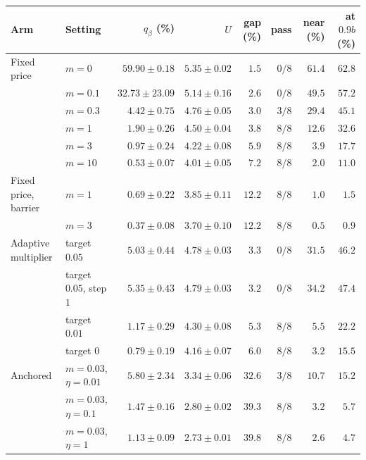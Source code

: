 \setlength{\tabcolsep}{4pt}\begin{tabular}{llrrrrrr}
\toprule
Arm & Setting & $q_\beta$ (\%) & $U$ & gap (\%) & pass & near (\%) & at $0.9b$ (\%) \\
\midrule
Fixed price & $m=0$ & $59.90\pm0.18$ & $5.35\pm0.02$ & $1.5$ & $0/8$ & $61.4$ & $62.8$ \\
 & $m=0.1$ & $32.73\pm23.09$ & $5.14\pm0.16$ & $2.6$ & $0/8$ & $49.5$ & $57.2$ \\
 & $m=0.3$ & $4.42\pm0.75$ & $4.76\pm0.05$ & $3.0$ & $3/8$ & $29.4$ & $45.1$ \\
 & $m=1$ & $1.90\pm0.26$ & $4.50\pm0.04$ & $3.8$ & $8/8$ & $12.6$ & $32.6$ \\
 & $m=3$ & $0.97\pm0.24$ & $4.22\pm0.08$ & $5.9$ & $8/8$ & $3.9$ & $17.7$ \\
 & $m=10$ & $0.53\pm0.07$ & $4.01\pm0.05$ & $7.2$ & $8/8$ & $2.0$ & $11.0$ \\
Fixed price, barrier & $m=1$ & $0.69\pm0.22$ & $3.85\pm0.11$ & $12.2$ & $8/8$ & $1.0$ & $1.5$ \\
 & $m=3$ & $0.37\pm0.08$ & $3.70\pm0.10$ & $12.2$ & $8/8$ & $0.5$ & $0.9$ \\
Adaptive multiplier & target $0.05$ & $5.03\pm0.44$ & $4.78\pm0.03$ & $3.3$ & $0/8$ & $31.5$ & $46.2$ \\
 & target $0.05$, step $1$ & $5.35\pm0.43$ & $4.79\pm0.03$ & $3.2$ & $0/8$ & $34.2$ & $47.4$ \\
 & target $0.01$ & $1.17\pm0.29$ & $4.30\pm0.08$ & $5.3$ & $8/8$ & $5.5$ & $22.2$ \\
 & target $0$ & $0.79\pm0.19$ & $4.16\pm0.07$ & $6.0$ & $8/8$ & $3.2$ & $15.5$ \\
Anchored & $m=0.03$, $\eta=0.01$ & $5.80\pm2.34$ & $3.34\pm0.06$ & $32.6$ & $3/8$ & $10.7$ & $15.2$ \\
 & $m=0.03$, $\eta=0.1$ & $1.47\pm0.16$ & $2.80\pm0.02$ & $39.3$ & $8/8$ & $3.2$ & $5.7$ \\
 & $m=0.03$, $\eta=1$ & $1.13\pm0.09$ & $2.73\pm0.01$ & $39.8$ & $8/8$ & $2.6$ & $4.7$ \\
\bottomrule
\end{tabular}
